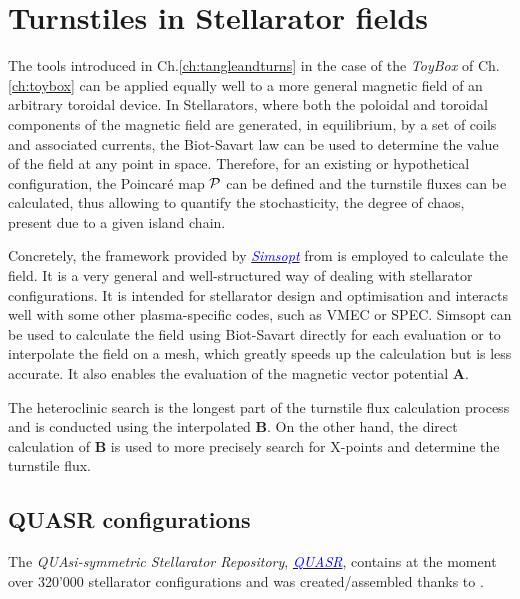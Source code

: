 

\chapter{Turnstiles in Stellarator fields}

The tools introduced in Ch.\ref{ch:tangleandturns} in the case of the \textit{ToyBox} of Ch.\ref{ch:toybox} can be applied equally well to a more general magnetic field of an arbitrary toroidal device. In Stellarators, where both the poloidal and toroidal components of the magnetic field are generated, in equilibrium, by a set of coils and associated currents, the Biot-Savart law can be used to determine the value of the field at any point in space. Therefore, for an existing or hypothetical configuration, the Poincaré map $\mathcal{P}$ can be defined and the turnstile fluxes can be calculated, thus allowing to quantify the stochasticity, the degree of chaos, present due to a given island chain.

Concretely, the framework provided by 
\href{https://simsopt.readthedocs.io/en/latest}{\textcolor{blue}{\textit{Simsopt}}} from \citeauthor{medasani_hiddensymmetriessimsopt_2024} is employed to calculate the field. It is a very general and well-structured way of dealing with stellarator configurations. It is intended for stellarator design and optimisation and interacts well with some other plasma-specific codes, such as VMEC or SPEC. Simsopt can be used to calculate the field using Biot-Savart directly for each evaluation or to interpolate the field on a mesh, which greatly speeds up the calculation but is less accurate. It also enables the evaluation of the magnetic vector potential $\textbf{A}$.

The heteroclinic search is the longest part of the turnstile flux calculation process and is conducted using the interpolated $\textbf{B}$. On the other hand, the direct calculation of $\textbf{B}$ is used to more precisely search for X-points and determine the turnstile flux.

\section{QUASR configurations}

The \textit{QUAsi-symmetric Stellarator Repository}, \href{https://quasr.flatironinstitute.org/}{\textcolor{blue}{\textit{QUASR}}}, contains at the moment over 320'000 stellarator configurations and was created/assembled thanks to \cite{andrew_giuliani_quasr_nodate}.


